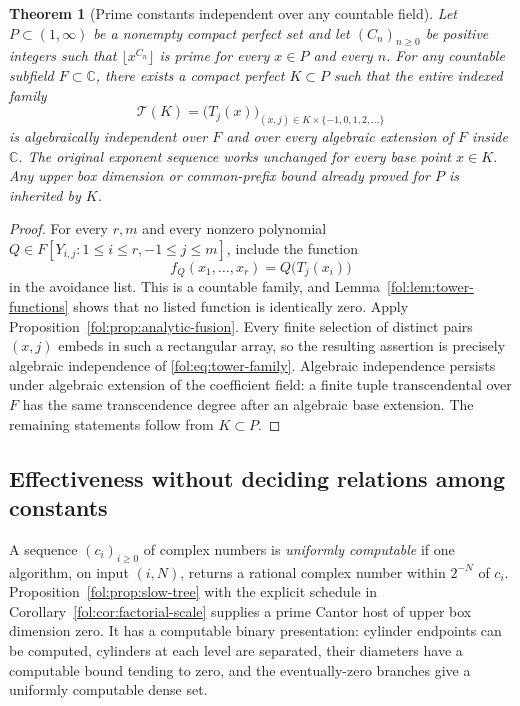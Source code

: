 \documentclass[11pt,a4paper]{article}
\newtheorem{theorem}{Theorem}[section]
\theoremstyle{definition}
\theoremstyle{remark}
\numberwithin{equation}{section}
\begin{document}
\begin{theorem}[Prime constants independent over any countable field]
\label{fol:thm:relative-towers}
Let $P\subset(1,\infty)$ be a nonempty compact perfect set and let
$(C_n)_{n\ge0}$ be positive integers such that
$\lfloor x^{C_n}\rfloor$ is prime for every $x\in P$ and every $n$.
For any countable subfield $F\subset\mathbb C$, there exists a compact
perfect $K\subset P$ such that the entire indexed family
\begin{equation}\label{fol:eq:tower-family}
 \mathcal T(K)=\bigl(T_j(x)\bigr)_{(x,j)\in K\times\{-1,0,1,2,\ldots\}}
\end{equation}
is algebraically independent over $F$ and over every algebraic
extension of $F$ inside $\mathbb C$.
The original exponent sequence works unchanged for every base point
$x\in K$. Any upper box dimension or common-prefix bound already proved
for $P$ is inherited by $K$.
\end{theorem}
\begin{proof}
For every $r,m$ and every nonzero polynomial
$Q\in F[Y_{i,j}:1\le i\le r,-1\le j\le m]$, include the function
\[
 f_Q(x_1,\ldots,x_r)=Q\bigl(T_j(x_i)\bigr)
\]
in the avoidance list. This is a countable family, and
Lemma~\ref{fol:lem:tower-functions} shows that no listed function is
identically zero. Apply Proposition~\ref{fol:prop:analytic-fusion}.
Every finite selection of distinct pairs $(x,j)$ embeds in such a
rectangular array, so the resulting assertion is precisely algebraic
independence of \eqref{fol:eq:tower-family}. Algebraic independence persists
under algebraic extension of the coefficient field: a finite tuple
transcendental over $F$ has the same transcendence degree after an
algebraic base extension. The remaining statements follow from
$K\subset P$.
\end{proof}

\subsection{Effectiveness without deciding relations among constants}
A sequence $(c_i)_{i\ge0}$ of complex numbers is \emph{uniformly
computable} if one algorithm, on input $(i,N)$, returns a rational
complex number within $2^{-N}$ of $c_i$. Proposition~\ref{fol:prop:slow-tree}
with the explicit schedule in Corollary~\ref{fol:cor:factorial-scale} supplies
a prime Cantor host of upper box dimension zero. It has a computable
binary presentation: cylinder endpoints can be
computed, cylinders at each level are separated, their diameters have a
computable bound tending to zero, and the eventually-zero branches give
a uniformly computable dense set.
\end{document}

